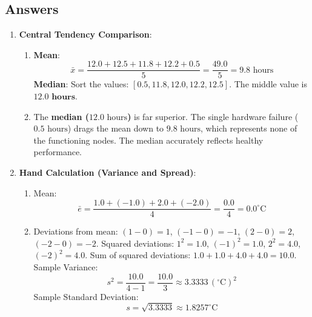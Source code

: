 \subsection*{Answers}

\begin{enumerate}
    \item \textbf{Central Tendency Comparison}:
    \begin{enumerate}
        \item \textbf{Mean}:
        \begin{equation*}
        \bar{x} = \frac{12.0 + 12.5 + 11.8 + 12.2 + 0.5}{5} = \frac{49.0}{5} = 9.8\text{ hours}
        \end{equation*}
        \textbf{Median}: Sort the values: $[0.5, 11.8, \mathbf{12.0}, 12.2, 12.5]$. The middle value is $\mathbf{12.0\text{ hours}}$.
        \item The \textbf{median ($12.0\text{ hours}$)} is far superior. The single hardware failure ($0.5\text{ hours}$) drags the mean down to $9.8\text{ hours}$, which represents none of the functioning nodes. The median accurately reflects healthy performance.
    \end{enumerate}

    \item \textbf{Hand Calculation (Variance and Spread)}:
    \begin{enumerate}
        \item Mean:
        \begin{equation*}
        \bar{e} = \frac{1.0 + (-1.0) + 2.0 + (-2.0)}{4} = \frac{0.0}{4} = 0.0^\circ\text{C}
        \end{equation*}
        \item Deviations from mean: $(1-0)=1$, $(-1-0)=-1$, $(2-0)=2$, $(-2-0)=-2$.
        Squared deviations: $1^2 = 1.0$, $(-1)^2 = 1.0$, $2^2 = 4.0$, $(-2)^2 = 4.0$.
        Sum of squared deviations: $1.0 + 1.0 + 4.0 + 4.0 = 10.0$.
        Sample Variance:
        \begin{equation*}
        s^2 = \frac{10.0}{4 - 1} = \frac{10.0}{3} \approx 3.3333\,(^\circ\text{C})^2
        \end{equation*}
        Sample Standard Deviation:
        \begin{equation*}
        s = \sqrt{3.3333} \approx 1.8257^\circ\text{C}
        \end{equation*}
    \end{enumerate}


\end{enumerate}

